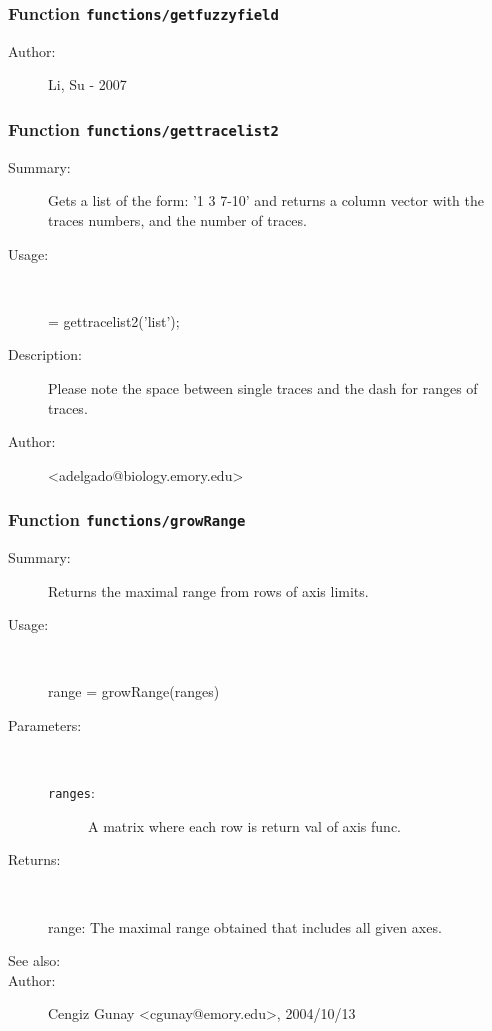 \subsubsection[Function \texttt{getfuzzyfield}]{Function \texttt{functions/getfuzzyfield}}%
%
\label{ref_functions__getfuzzyfield}%
\hypertarget{ref_functions__getfuzzyfield}{}%
\begin{description}
%
%
%
%
%
%
%
\item[Author:]%
Li, Su - 2007
%
\end{description}
\methodline%
\subsubsection[Function \texttt{gettracelist2}]{Function \texttt{functions/gettracelist2}}%
%
\label{ref_functions__gettracelist2}%
\hypertarget{ref_functions__gettracelist2}{}%
\begin{description}
\item[Summary:]Gets a list of the form: '1 3 7-10' and returns a column vector with the traces numbers, and the number of traces.
%
\item[Usage:]~%
\begin{lyxcode}%
[traces, ntraces] = gettracelist2('list');
%
\end{lyxcode}%
%
\item[Description:]%
Please note the space between single traces and the dash for ranges of
traces.
%
%
%
%
\item[Author:]%
<adelgado@biology.emory.edu>
%
\end{description}
\methodline%
\subsubsection[Function \texttt{growRange}]{Function \texttt{functions/growRange}}%
%
\label{ref_functions__growRange}%
\hypertarget{ref_functions__growRange}{}%
\begin{description}
\item[Summary:]Returns the maximal range from rows of axis limits. 
%
\item[Usage:]~%
\begin{lyxcode}%
range = growRange(ranges)
%
\end{lyxcode}%
%
%
\item[Parameters:]~
\begin{description}%
\item[\texttt{ranges}:]
 A matrix where each row is return val of axis func.
\end{description}%
%
\item[Returns:
]~

	range: The maximal range obtained that includes all given axes.
%
%
\item[See also:]%
%
\item[Author:]%
Cengiz Gunay <cgunay@emory.edu>, 2004/10/13
%
\end{description}
\methodline%
